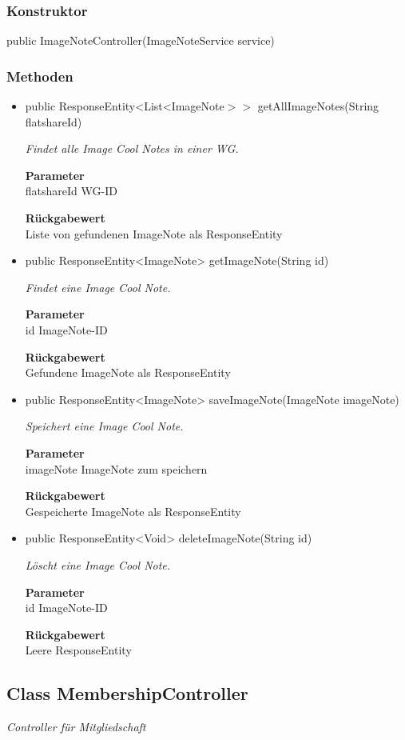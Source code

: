 \documentclass[a4paper]{scrreprt}
\begin{document}
    \subsubsection{Konstruktor}
    public ImageNoteController(ImageNoteService service)
    \subsubsection{Methoden}
    \begin{itemize}
    	\item{public ResponseEntity<List<ImageNote$>>$ getAllImageNotes(String flatshareId)}
    	
    	\textit{Findet alle Image Cool Notes in einer WG.}
    	
    	\textbf{Parameter} \\
    	flatshareId WG-ID
    	
    	\textbf{Rückgabewert} \\
    	Liste von gefundenen ImageNote als ResponseEntity        \item{public ResponseEntity<ImageNote> getImageNote(String id)}
    	
    	\textit{Findet eine Image Cool Note.}
    	
    	\textbf{Parameter} \\
    	id ImageNote-ID
    	
    	\textbf{Rückgabewert} \\
    	Gefundene ImageNote als ResponseEntity        \item{public ResponseEntity<ImageNote> saveImageNote(ImageNote imageNote)}
    	
    	\textit{Speichert eine Image Cool Note.}
    	
    	\textbf{Parameter} \\
    	imageNote ImageNote zum speichern
    	
    	\textbf{Rückgabewert} \\
    	Gespeicherte ImageNote als ResponseEntity        \item{public ResponseEntity<Void> deleteImageNote(String id)}
    	
    	\textit{Löscht eine Image Cool Note.}
    	
    	\textbf{Parameter} \\
    	id ImageNote-ID
    	
    	\textbf{Rückgabewert} \\
    	Leere ResponseEntity
    \end{itemize}
    \subsection{Class MembershipController}
    \textit{Controller für Mitgliedschaft}
\end{document}

